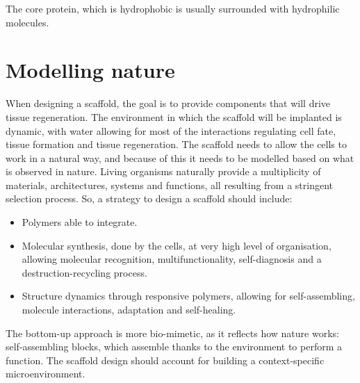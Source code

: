 		The core protein, which is hydrophobic is usually surrounded with hydrophilic molecules.

\section{Modelling nature}
When designing a scaffold, the goal is to provide components that will drive tissue regeneration.
The environment in which the scaffold will be implanted is dynamic, with water allowing for most of the interactions regulating cell fate, tissue formation and tissue regeneration.
The scaffold needs to allow the cells to work in a natural way, and because of this it needs to be modelled based on what is observed in nature.
Living organisms naturally provide a multiplicity of materials, architectures, systems and functions, all resulting from a stringent selection process.
So, a strategy to design a scaffold should include:

\begin{multicols}{2}
	\begin{itemize}
		\item Polymers able to integrate.
		\item Molecular synthesis, done by the cells, at very high level of organisation, allowing molecular recognition, multifunctionality, self-diagnosis and a destruction-recycling process.
		\item Structure dynamics through responsive polymers, allowing for self-assembling, molecule interactions, adaptation and self-healing.
	\end{itemize}
\end{multicols}

The bottom-up approach is more bio-mimetic, as it reflects how nature works: self-assembling blocks, which assemble thanks to the environment to perform a function.
The scaffold design should account for building a context-specific microenvironment.
